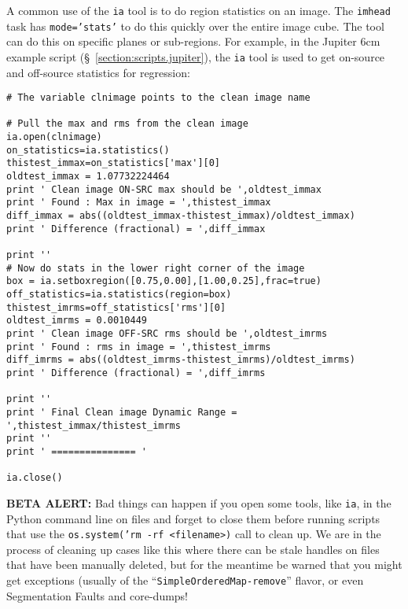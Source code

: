 A common use of the {\tt ia} tool is to do region statistics on
an image.  The {\tt imhead} task has {\tt mode='stats'} to do
this quickly over the entire image cube.  The tool can do this
on specific planes or sub-regions.  For example, in the Jupiter
6cm example script (\S~\ref{section:scripts.jupiter}), 
the {\tt ia} tool is used to get on-source and off-source statistics
for regression:
\small
\begin{verbatim}
# The variable clnimage points to the clean image name

# Pull the max and rms from the clean image
ia.open(clnimage)
on_statistics=ia.statistics()
thistest_immax=on_statistics['max'][0]
oldtest_immax = 1.07732224464
print ' Clean image ON-SRC max should be ',oldtest_immax
print ' Found : Max in image = ',thistest_immax
diff_immax = abs((oldtest_immax-thistest_immax)/oldtest_immax)
print ' Difference (fractional) = ',diff_immax

print ''
# Now do stats in the lower right corner of the image
box = ia.setboxregion([0.75,0.00],[1.00,0.25],frac=true)
off_statistics=ia.statistics(region=box)
thistest_imrms=off_statistics['rms'][0]
oldtest_imrms = 0.0010449
print ' Clean image OFF-SRC rms should be ',oldtest_imrms
print ' Found : rms in image = ',thistest_imrms
diff_imrms = abs((oldtest_imrms-thistest_imrms)/oldtest_imrms)
print ' Difference (fractional) = ',diff_imrms

print ''
print ' Final Clean image Dynamic Range = ',thistest_immax/thistest_imrms
print ''
print ' =============== '

ia.close()

\end{verbatim}
\normalsize

{\bf BETA ALERT:} Bad things can happen if you open some tools,
like {\tt ia}, in the Python command line on files and forget to
close them before running scripts that use the 
{\tt os.system('rm -rf <filename>)} call to clean up.  We are 
in the process of cleaning up cases like this where there can
be stale handles on files that have been manually deleted, but
for the meantime be warned that you might get exceptions
(usually of the ``{\tt SimpleOrderedMap-remove}'' flavor, or 
even Segmentation Faults and core-dumps!

